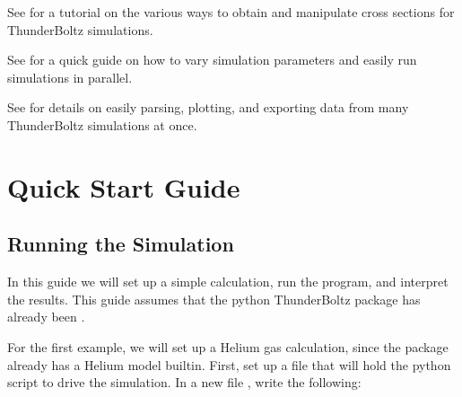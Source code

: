 \documentclass[letterpaper,10pt,english,openany,oneside]{sphinxmanual}
\begin{document}
\sphinxAtStartPar
See {\hyperref[\detokenize{cs_guide::doc}]{}} for a tutorial on the various
ways to obtain and manipulate cross sections for ThunderBoltz simulations.

\sphinxAtStartPar
See {\hyperref[\detokenize{multi_guide::doc}]{}} for a quick guide on
how to vary simulation parameters and easily run simulations in
parallel.

\sphinxAtStartPar
See {\hyperref[\detokenize{ext_guide::doc}]{}} for details on easily parsing,
plotting, and exporting data from many ThunderBoltz simulations at once.

\sphinxstepscope


\section{Quick Start Guide}
\label{\detokenize{quickstart:quick-start-guide}}\label{\detokenize{quickstart::doc}}

\subsection{Running the Simulation}
\label{\detokenize{quickstart:running-the-simulation}}
\sphinxAtStartPar
In this guide we will set up a simple calculation, run the program, and
interpret the results. This guide assumes that the python ThunderBoltz
package has already been {\hyperref[\detokenize{index::doc}]{}}.

\sphinxAtStartPar
For the first example, we will set up a Helium gas calculation,
since the package already has a Helium model built\sphinxhyphen{}in. First, set up
a file that will hold the python script to drive the simulation.
In a new file , write the following:
\end{document}
